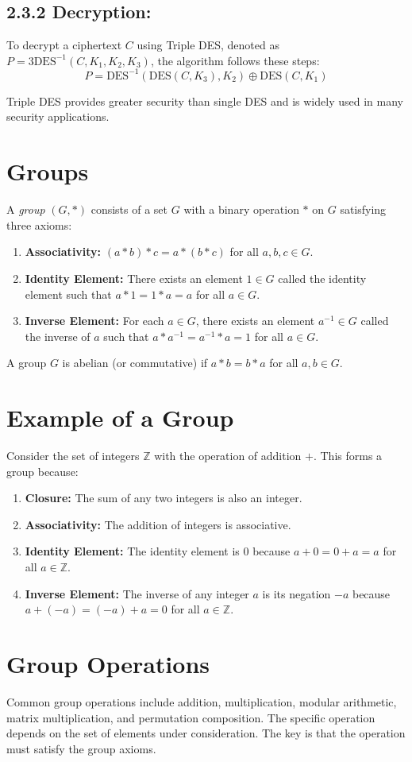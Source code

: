 \documentclass[11pt]{article}
\begin{document}
\subsection*{2.3.2 Decryption:}
To decrypt a ciphertext \(C\) using Triple DES, denoted as \(P = \text{3DES}^{-1}(C, K_1, K_2, K_3)\), the algorithm follows these steps:
\[ P = \text{DES}^{-1}(\text{DES}(C, K_3), K_2) \oplus \text{DES}(C, K_1) \]

Triple DES provides greater security than single DES and is widely used in many security applications.


\section*{Groups}

A \textit{group} $(G, \ast)$ consists of a set $G$ with a binary operation $\ast$ on $G$ satisfying three axioms:

\begin{enumerate}
    \item \textbf{Associativity:} $(a \ast b) \ast c = a \ast (b \ast c)$ for all $a, b, c \in G$.
    \item \textbf{Identity Element:} There exists an element $1 \in G$ called the identity element such that $a \ast 1 = 1 \ast a = a$ for all $a \in G$.
    \item \textbf{Inverse Element:} For each $a \in G$, there exists an element $a^{-1} \in G$ called the inverse of $a$ such that $a \ast a^{-1} = a^{-1} \ast a = 1$ for all $a \in G$.
\end{enumerate}

A group $G$ is abelian (or commutative) if $a \ast b = b \ast a$ for all $a, b \in G$.

\section*{Example of a Group}

Consider the set of integers $\mathbb{Z}$ with the operation of addition $+$. This forms a group because:

\begin{enumerate}
    \item \textbf{Closure:} The sum of any two integers is also an integer.
    \item \textbf{Associativity:} The addition of integers is associative.
    \item \textbf{Identity Element:} The identity element is $0$ because $a + 0 = 0 + a = a$ for all $a \in \mathbb{Z}$.
    \item \textbf{Inverse Element:} The inverse of any integer $a$ is its negation $-a$ because $a + (-a) = (-a) + a = 0$ for all $a \in \mathbb{Z}$.
\end{enumerate}

\section*{Group Operations}

Common group operations include addition, multiplication, modular arithmetic, matrix multiplication, and permutation composition. The specific operation depends on the set of elements under consideration. The key is that the operation must satisfy the group axioms.
\end{document}
